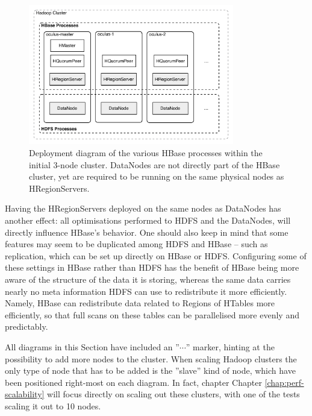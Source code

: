 \begin{figure}[ch!]
  \centering
  \includegraphics[width=0.8\textwidth]{img/hbase-processes}
  \caption{Deployment diagram of the various HBase processes within the initial 3-node cluster. DataNodes are not directly part of the HBase cluster, yet are required to be running on the same physical nodes as HRegionServers.}
  \label{fig:small-cluster-deployment}
\end{figure}

Having the HRegionServers deployed on the same nodes as DataNodes has another effect: all optimisations performed to HDFS and the DataNodes, will directly influence HBase's behavior. One should also keep in mind that some features may seem to be duplicated among HDFS and HBase -- such as replication, which can be set up directly on HBase or HDFS. Configuring some of these settings in HBase rather than HDFS has the benefit of HBase being more aware of the structure of the data it is storing, whereas the same data carries nearly no meta information HDFS can use to redistribute it more efficiently. 
Namely, HBase can redistribute data related to Regions of HTables more efficiently, so that full scans on these tables can be parallelised more evenly and predictably.

All diagrams in this Section have included an ''$\cdots$'' marker, hinting at the possibility to add more nodes to the cluster. When scaling Hadoop clusters the only type of node that has to be added is the ''slave'' kind of node, which have been positioned right-most on each diagram. In fact, chapter Chapter \ref{chap:perf-scalability} will focus directly on scaling out these clusters, with one of the tests scaling it out to 10 nodes.

